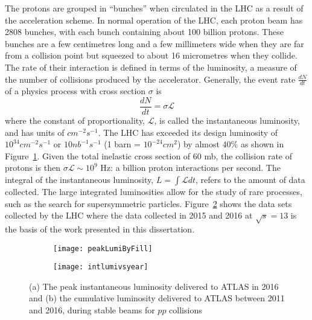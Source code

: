 The protons are grouped in ``bunches'' when circulated in the LHC as a result of the acceleration 
scheme.
In normal operation of the LHC, each proton beam has 2808 bunches, with each bunch containing 
about 100 billion protons. 
These bunches are a few centimetres long and a few millimeters wide when they are far from a 
collision point but squeezed to about 16 micrometres when they collide.
The rate of their interaction is defined in terms of the luminosity, a 
measure of the number of collisions produced by the accelerator.
Generally, the event rate $\frac{dN}{dt}$ of a physics process with cross section $\sigma$ is
\begin{equation}
\frac{dN}{dt} = \sigma  \mathcal{L} 
\label{eq:exp.lhc.lumi}
\end{equation}
where the constant of proportionality, $\mathcal{L}$, is called the instantaneous luminosity,
and has units of $cm^{-2}s^{-1}$.
The LHC has exceeded its design luminosity of $10^{34}cm^{-2}s^{-1}$ or $10 nb^{-1}s^{-1}$ (1 barn = $10^{-24} cm^2$) 
by almost 40\% as shown in Figure~\ref{fig:exp.lhc.peakLumiByFill}.
Given the total inelastic cross section of 60 mb, 
the collision rate of protons is then $ \sigma  \mathcal{L} \sim 10^9$ Hz: a billion proton
interactions per second.
The integral of the instantaneous luminosity, $L = \int  \mathcal{L} dt$, refers to the amount 
of data collected. 
The large integrated luminosities allow for the study of rare processes, such as the search for 
supersymmetric particles.
Figure~\ref{fig:exp.lhc.intlumivsyear} shows the data sets collected by the LHC where 
the data collected in 2015 and 2016 at $\sqrt{s}=13$ \TeV is the basis of the work 
presented in this dissertation. 

\begin{figure}[!htb]
\centering
\begin{subfigure}[t]{0.48\textwidth}
\texttt{[image: peakLumiByFill]}
\subcaption{}
\label{fig:exp.lhc.peakLumiByFill}
\end{subfigure}
\begin{subfigure}[t]{0.48\textwidth}
\texttt{[image: intlumivsyear]}
\subcaption{}
\label{fig:exp.lhc.intlumivsyear}
\end{subfigure}
\vspace{-0.25cm}
\caption{(a) The peak instantaneous luminosity delivered to ATLAS in 2016
and (b) the cumulative luminosity delivered to ATLAS between 2011 and 2016, 
during stable beams for $pp$ collisions}
\label{fig:exp.lhc.peak}
\end{figure} 

